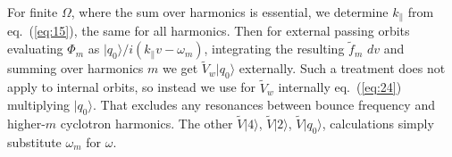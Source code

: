 \documentclass[12pt]{article}
\def\ket#1{|#1\rangle}
\begin{document}
For finite $\Omega$, where the sum over harmonics is essential, we
determine $k_\parallel$ from eq.\ (\ref{eq:15}), the same for all
harmonics. Then for external passing orbits evaluating $\Phi_m$ as
$\ket{q_0}/i(k_\parallel v -\omega_m)$, integrating the resulting
$\tilde f_m$ $dv$ and summing over harmonics $m$ we get
$\tilde V_w\ket{q_0}$ externally. Such a treatment does not
apply to internal orbits, so instead we use for $\tilde V_w$ internally
eq.\ (\ref{eq:24}) multiplying $\ket{q_0}$. That excludes any resonances
between bounce frequency and higher-$m$ cyclotron harmonics. The other
$\tilde V\ket{4}$, $\tilde V\ket{2}$, $\tilde V\ket{q_0}$, calculations
simply substitute $\omega_m$ for $\omega$.
\end{document}
